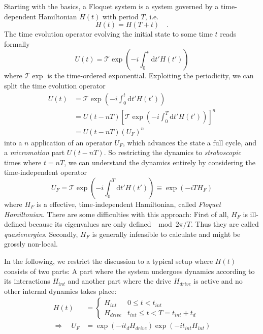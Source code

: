 Starting with the basics, a Floquet system is a system governed by a time-dependent Hamiltonian $H(t)$ with period $T$, i.e. 
\begin{equation}
	H(t) = H(T+t)\quad.
\end{equation}
The time evolution operator evolving the initial state to some time $t$ reads formally
\begin{equation}
	U(t) = \mathcal{T}\exp(-i\int_0^t\!\mathrm{d}t'H(t'))
\end{equation}
where $\mathcal{T}\exp$ is the time-ordered exponential.
Exploiting the periodicity, we can split the time evolution operator
\begin{align}
	U(t) &= \mathcal{T}\exp(-i\int_0^t\!\mathrm{d}t'H(t'))\\
	&= U(t-nT)\left[\mathcal{T}\exp(-i\int_0^T\!\mathrm{d}t'H(t'))\right]^n\\
	&= U(t-nT) (U_F)^n
\end{align}
into a $n$ application of an operator $U_F$, which advances the state a full cycle, and a \emph{micromotion} part $U(t-nT)$. So restricting the dynamics to \emph{stroboscopic} times where $t=nT$, we can understand the dynamics entirely by considering the time-independent operator
\begin{equation}
	U_F = \mathcal{T}\exp(-i\int_0^T\!\mathrm{d}t'H(t')) \equiv \exp(-iTH_F)
\end{equation}
where $H_F$ is a effective, time-independent Hamiltonian, called \emph{Floquet Hamiltonian}. There are some difficulties with this approach: First of all, $H_F$ is ill-defined because its eigenvalues are only defined $\mod 2\pi/T$. Thus they are called \emph{quasienergies}. Secondly, $H_F$ is generally infeasible to calculate and might be grossly non-local.

In the following, we restrict the discussion to a typical setup where $H(t)$ consists of two parts: A part where the system undergoes dynamics according to its interactions $H_{int}$ and another part where the drive $H_{drive}$ is active and no other internal dynamics takes place:
\begin{align}
	H(t) &= \begin{cases}
		H_{int} & 0 \leq t < t_{int}\\
		H_{drive} & t_{int} \leq t < T=t_{int}+t_{d}
	\end{cases}\\
\Rightarrow\quad U_F &= \exp\left(-it_{d}H_{drive}\right)\exp\left(-it_{int}H_{int}\right) \label{eq:simple-floquet}
\end{align}

